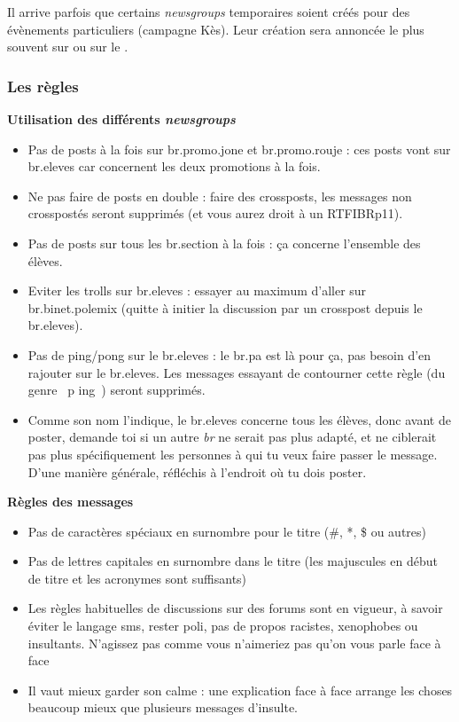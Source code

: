 Il arrive parfois que certains \emph{newsgroups} temporaires soient créés pour des évènements particuliers (campagne Kès). Leur création sera annoncée
le plus souvent sur \fkz ou sur le .

\subsubsection{Les règles}
\textbf{Utilisation des différents \emph{newsgroups}}
\begin{itemize}
 \item Pas de posts à la fois sur br.promo.jone et br.promo.rouje : ces posts vont sur br.eleves car concernent les deux promotions à
       la fois.
 \item Ne pas faire de posts en double : faire des crossposts, les messages non crosspostés seront supprimés (et vous aurez droit à        un RTFIBRp11).
 \item Pas de posts sur tous les br.section à la fois : ça concerne l'ensemble des élèves.
 \item Eviter les trolls sur br.eleves : essayer au maximum d'aller sur br.binet.polemix (quitte à initier la discussion par un
       crosspost depuis le br.eleves).
 \item Pas de ping/pong sur le br.eleves : le br.pa est là pour ça, pas besoin d'en rajouter sur le br.eleves. Les messages essayant
       de contourner cette règle (du genre \guillemotleft~p ing~\guillemotright) seront supprimés.
 \item Comme son nom l'indique, le br.eleves concerne tous les élèves, donc avant de poster, demande toi si un autre \emph{br} ne serait pas plus adapté, et ne ciblerait pas plus spécifiquement les personnes à qui tu veux faire passer le message. D'une manière générale, réfléchis à l'endroit où tu dois poster.
\end{itemize}

\textbf{Règles des messages}
\begin{itemize}
 \item Pas de caractères spéciaux en surnombre pour le titre (\#, *, \$ ou autres)
 \item Pas de lettres capitales en surnombre dans le titre (les majuscules en début de titre et les acronymes sont suffisants)
 \item Les règles habituelles de discussions sur des forums sont en vigueur, à savoir éviter le langage sms, rester poli, pas de propos racistes, xenophobes ou insultants. N'agissez pas comme vous n'aimeriez pas qu'on vous parle face à face
 \item Il vaut mieux garder son calme : une explication face à face arrange les choses beaucoup mieux que plusieurs messages d'insulte.
\end{itemize}

